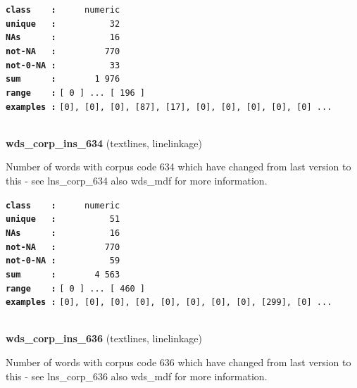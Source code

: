 \documentclass[]{article}
\begin{document}
\textbf{\texttt{class\ \ \ \ :}} \texttt{~~~~~numeric}\\
\textbf{\texttt{unique\ \ \ :}} \texttt{~~~~~~~~~~32}\\
\textbf{\texttt{NAs\ \ \ \ \ \ :}} \texttt{~~~~~~~~~~16}\\
\textbf{\texttt{not-NA\ \ \ :}} \texttt{~~~~~~~~~770}\\
\textbf{\texttt{not-0-NA\ :}} \texttt{~~~~~~~~~~33}\\
\textbf{\texttt{sum\ \ \ \ \ \ :}} \texttt{~~~~~~~1~976}\\
\textbf{\texttt{range\ \ \ \ :}}
\texttt{{[}\ 0\ {]}\ ...\ {[}\ 196\ {]}}\\
\textbf{\texttt{examples\ :}}
\texttt{{[}0{]},\ {[}0{]},\ {[}0{]},\ {[}87{]},\ {[}17{]},\ {[}0{]},\ {[}0{]},\ {[}0{]},\ {[}0{]},\ {[}0{]}\ ...}\\

~

\textbf{wds\_corp\_ins\_634} (textlines, linelinkage)

Number of words with corpus code 634 which have changed from last
version to this - see lns\_corp\_634 also wds\_mdf for more information.

\textbf{\texttt{class\ \ \ \ :}} \texttt{~~~~~numeric}\\
\textbf{\texttt{unique\ \ \ :}} \texttt{~~~~~~~~~~51}\\
\textbf{\texttt{NAs\ \ \ \ \ \ :}} \texttt{~~~~~~~~~~16}\\
\textbf{\texttt{not-NA\ \ \ :}} \texttt{~~~~~~~~~770}\\
\textbf{\texttt{not-0-NA\ :}} \texttt{~~~~~~~~~~59}\\
\textbf{\texttt{sum\ \ \ \ \ \ :}} \texttt{~~~~~~~4~563}\\
\textbf{\texttt{range\ \ \ \ :}}
\texttt{{[}\ 0\ {]}\ ...\ {[}\ 460\ {]}}\\
\textbf{\texttt{examples\ :}}
\texttt{{[}0{]},\ {[}0{]},\ {[}0{]},\ {[}0{]},\ {[}0{]},\ {[}0{]},\ {[}0{]},\ {[}0{]},\ {[}299{]},\ {[}0{]}\ ...}\\

~

\textbf{wds\_corp\_ins\_636} (textlines, linelinkage)

Number of words with corpus code 636 which have changed from last
version to this - see lns\_corp\_636 also wds\_mdf for more information.
\end{document}

